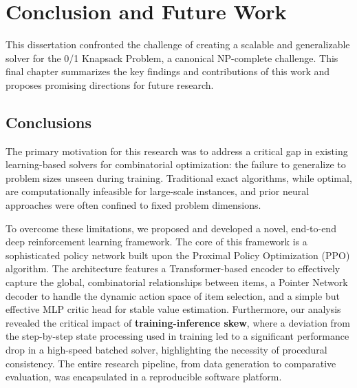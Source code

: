 

% 
% 


\chapter{Conclusion and Future Work}
\label{chap:conclusion_future_work}

This dissertation confronted the challenge of creating a scalable and generalizable solver for the 0/1 Knapsack Problem, a canonical NP-complete challenge. This final chapter summarizes the key findings and contributions of this work and proposes promising directions for future research.

\section{Conclusions}
\label{sec:conclusions}

The primary motivation for this research was to address a critical gap in existing learning-based solvers for combinatorial optimization: the failure to generalize to problem sizes unseen during training. Traditional exact algorithms, while optimal, are computationally infeasible for large-scale instances, and prior neural approaches were often confined to fixed problem dimensions.

To overcome these limitations, we proposed and developed a novel, end-to-end deep reinforcement learning framework. The core of this framework is a sophisticated policy network built upon the Proximal Policy Optimization (PPO) algorithm. The architecture features a Transformer-based encoder to effectively capture the global, combinatorial relationships between items, a Pointer Network decoder to handle the dynamic action space of item selection, and a simple but effective MLP critic head for stable value estimation. Furthermore, our analysis revealed the critical impact of \textbf{training-inference skew}, where a deviation from the step-by-step state processing used in training led to a significant performance drop in a high-speed batched solver, highlighting the necessity of procedural consistency. The entire research pipeline, from data generation to comparative evaluation, was encapsulated in a reproducible software platform.

